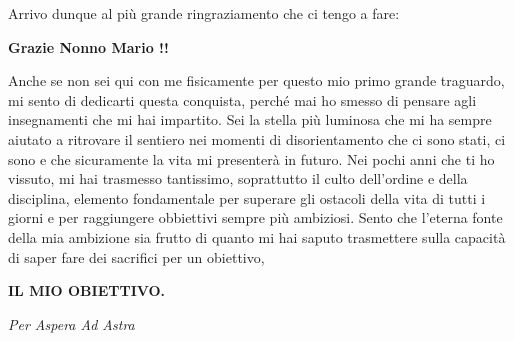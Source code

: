 Arrivo dunque al più grande ringraziamento che ci tengo a fare: 

\begin{center}
\textbf{Grazie Nonno Mario !!}
\end{center}

Anche se non sei qui con me fisicamente per questo mio primo grande traguardo, mi sento di dedicarti questa conquista, perché mai ho smesso di pensare agli insegnamenti che mi hai impartito.
Sei la stella più luminosa che mi ha sempre aiutato a ritrovare il sentiero nei momenti di disorientamento che ci sono stati, ci sono e che sicuramente la vita mi presenterà in futuro.
Nei pochi anni che ti ho vissuto, mi hai trasmesso tantissimo, soprattutto il culto dell'ordine e della disciplina, elemento fondamentale per superare gli ostacoli della vita di tutti i giorni e per raggiungere obbiettivi sempre più ambiziosi. Sento che l'eterna fonte della mia ambizione sia frutto di quanto mi hai saputo trasmettere sulla capacità di saper fare dei sacrifici per un obiettivo, 


\vspace{2cm}

\textbf{IL MIO OBIETTIVO.}

\begin{flushright}
\textit{Per Aspera Ad Astra}
\end{flushright}
